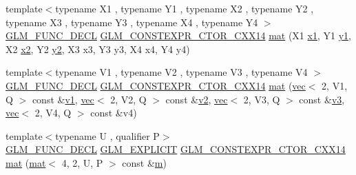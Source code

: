\begin{DoxyCompactItemize}
{\footnotesize template$<$typename X1 , typename Y1 , typename X2 , typename Y2 , typename X3 , typename Y3 , typename X4 , typename Y4 $>$ }\\\mbox{\hyperlink{setup_8hpp_ab2d052de21a70539923e9bcbf6e83a51}{G\+L\+M\+\_\+\+F\+U\+N\+C\+\_\+\+D\+E\+CL}} \mbox{\hyperlink{setup_8hpp_a0900f9145e68bf6061b6f5e7be3fa751}{G\+L\+M\+\_\+\+C\+O\+N\+S\+T\+E\+X\+P\+R\+\_\+\+C\+T\+O\+R\+\_\+\+C\+X\+X14}} \mbox{\hyperlink{structglm_1_1mat_3_014_00_012_00_01_t_00_01_q_01_4_ab215b674606585326f67e984d3eaf832}{mat}} (X1 \mbox{\hyperlink{_s_d_l__opengl__glext_8h_a49825216c96caaeb09237b36651181c5}{x1}}, Y1 \mbox{\hyperlink{_s_d_l__opengl__glext_8h_a3af6c78fcdfccea028a5878bc747ef39}{y1}}, X2 \mbox{\hyperlink{_s_d_l__opengl__glext_8h_a7b907a03236685c534d89d604cff23c8}{x2}}, Y2 \mbox{\hyperlink{_s_d_l__opengl__glext_8h_a2be1135ed68e8d80fa9e130c7814f8c2}{y2}}, X3 x3, Y3 y3, X4 x4, Y4 y4)
\item 
{\footnotesize template$<$typename V1 , typename V2 , typename V3 , typename V4 $>$ }\\\mbox{\hyperlink{setup_8hpp_ab2d052de21a70539923e9bcbf6e83a51}{G\+L\+M\+\_\+\+F\+U\+N\+C\+\_\+\+D\+E\+CL}} \mbox{\hyperlink{setup_8hpp_a0900f9145e68bf6061b6f5e7be3fa751}{G\+L\+M\+\_\+\+C\+O\+N\+S\+T\+E\+X\+P\+R\+\_\+\+C\+T\+O\+R\+\_\+\+C\+X\+X14}} \mbox{\hyperlink{structglm_1_1mat_3_014_00_012_00_01_t_00_01_q_01_4_a0a0b79d10d539aafa1d3985616846568}{mat}} (\mbox{\hyperlink{structglm_1_1vec}{vec}}$<$ 2, V1, Q $>$ const \&\mbox{\hyperlink{_s_d_l__opengl__glext_8h_a435c176a02c061b43e19bdf7c86cceae}{v1}}, \mbox{\hyperlink{structglm_1_1vec}{vec}}$<$ 2, V2, Q $>$ const \&\mbox{\hyperlink{_s_d_l__opengl__glext_8h_a0928f6d0f0f794ba000a21dfae422136}{v2}}, \mbox{\hyperlink{structglm_1_1vec}{vec}}$<$ 2, V3, Q $>$ const \&\mbox{\hyperlink{_s_d_l__opengl__glext_8h_acc806b31cbf466ceba6555983d8b814d}{v3}}, \mbox{\hyperlink{structglm_1_1vec}{vec}}$<$ 2, V4, Q $>$ const \&v4)
\item 
{\footnotesize template$<$typename U , qualifier P$>$ }\\\mbox{\hyperlink{setup_8hpp_ab2d052de21a70539923e9bcbf6e83a51}{G\+L\+M\+\_\+\+F\+U\+N\+C\+\_\+\+D\+E\+CL}} \mbox{\hyperlink{setup_8hpp_a6c74f5a5e7b134ab69023ff9a30d4d5d}{G\+L\+M\+\_\+\+E\+X\+P\+L\+I\+C\+IT}} \mbox{\hyperlink{setup_8hpp_a0900f9145e68bf6061b6f5e7be3fa751}{G\+L\+M\+\_\+\+C\+O\+N\+S\+T\+E\+X\+P\+R\+\_\+\+C\+T\+O\+R\+\_\+\+C\+X\+X14}} \mbox{\hyperlink{structglm_1_1mat_3_014_00_012_00_01_t_00_01_q_01_4_acae8a483921d714297536237a5f9013b}{mat}} (\mbox{\hyperlink{structglm_1_1mat}{mat}}$<$ 4, 2, U, P $>$ const \&\mbox{\hyperlink{_s_d_l__opengl__glext_8h_af593500c283bf1a787a6f947f503a5c2}{m}})

\end{DoxyCompactItemize}
